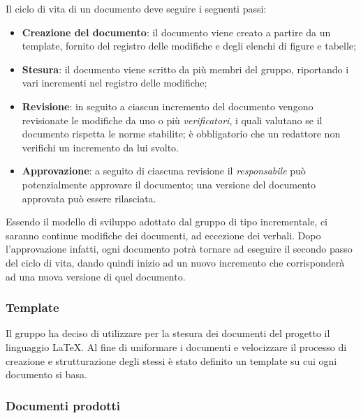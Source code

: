 Il ciclo di vita di un documento deve seguire i seguenti passi:
\begin{itemize}
    \item \textbf{Creazione del documento}: il documento viene creato a partire da un template, fornito del registro delle 
    	modifiche e degli elenchi di figure e tabelle;
    \item \textbf{Stesura}: il documento viene scritto da più membri del gruppo, riportando i vari incrementi nel registro delle modifiche;
    \item \textbf{Revisione}: in seguito a ciascun incremento del documento vengono revisionate le modifiche da uno o più 
    	\emph{verificatori}, i quali valutano se il documento rispetta le norme stabilite; \`{e} obbligatorio che un redattore non verifichi 
    	un incremento da lui svolto.
    \item \textbf{Approvazione}: a seguito di ciascuna revisione il \emph{responsabile} pu\`{o} potenzialmente approvare il documento; una 
    	versione del documento approvata pu\`{o} essere rilasciata.
\end{itemize}
Essendo il modello di sviluppo adottato dal gruppo di tipo incrementale, ci saranno continue modifiche dei documenti, ad eccezione dei verbali. 
Dopo l'approvazione infatti, ogni documento potrà tornare ad eseguire il secondo passo del ciclo di vita, dando quindi inizio ad un nuovo 
incremento che corrisponderà ad una nuova versione di quel documento.

\subsubsection{Template}
\label{ssub:template}

Il gruppo ha deciso di utilizzare per la stesura dei documenti del progetto il linguaggio \LaTeX. Al fine di 
uniformare i documenti e velocizzare il processo di creazione e strutturazione degli stessi è stato definito un 
template su cui ogni documento si basa.

\subsubsection{Documenti prodotti}
\label{ssub:documenti_prodotti}

